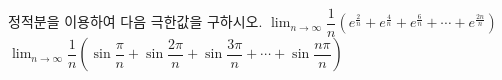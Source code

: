정적분을 이용하여 다음 극한값을 구하시오.
 $\displaystyle\lim_{n\to\infty}\dfrac{1}{n}(e^{\frac{2}{n}}+e^{\frac{4}{n}}+e^{\frac{6}{n}}+\cdots+e^{\frac{2n}{n}})$
 $\displaystyle\lim_{n\to\infty}\dfrac{1}{n}\left(\sin\dfrac{\pi}{n}+\sin\dfrac{2\pi}{n}+\sin\dfrac{3\pi}{n}+\cdots+\sin\dfrac{n\pi}{n}\right)$
